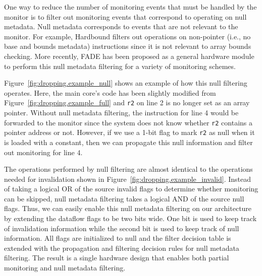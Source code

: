 One way to reduce the number of monitoring events that must be handled by the
monitor is to filter out monitoring events that correspond to operating on null
metadata. Null metadata corresponds to events that
are not relevant to the monitor. For example, Hardbound
\cite{hardbound-asplos08} filters out operations on non-pointer (i.e., no base
and bounds metadata) instructions since it is not relevant to array bounds
checking. More recently, FADE \cite{fade-hpca14} has been proposed as a general
hardware module to perform this null metadata filtering for a variety of
monitoring schemes. 

Figure~\ref{fig:dropping.example_null} shows an example of how this null filtering operates.
Here, the main core's code has been slightly modified from
Figure~\ref{fig:dropping.example_full} and {\tt r2} on line 2 is no longer set as an array pointer.
Without null metadata filtering, the instruction for line 4 would be
forwarded to the monitor since the system does not know whether {\tt r2}
contains a pointer address or not. However, if we use a 1-bit flag to mark {\tt r2}
as null when it is loaded with a constant, then we can propagate this null
information and filter out monitoring for line 4.

The operations performed by null filtering are almost identical to the
operations needed for invalidation shown in
Figure~\ref{fig:dropping.example_invalid}. Instead of taking a logical OR of the
source invalid flags to determine whether monitoring can be skipped, null
metadata filtering takes a logical AND of the source null flags.
Thus, we can easily enable this null metadata filtering on our architecture by
extending the dataflow flags to be two bits wide. One bit is used to
keep track of invalidation information while the second bit is used to keep
track of null information. All flags are initialized to null and the filter
decision table is extended with the propagation and filtering decision rules
for null metadata filtering.
The result is a single hardware design that enables both partial
monitoring and null metadata filtering.


